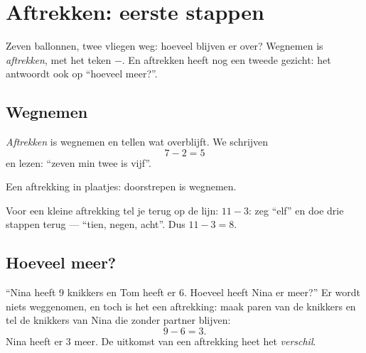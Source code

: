 \chapter{Aftrekken: eerste stappen}\label{ch:g1:subtraction}

Zeven ballonnen, twee vliegen weg: hoeveel blijven er over? Wegnemen is
\emph{aftrekken}, met het teken $-$. En aftrekken heeft nog een tweede
gezicht: het antwoordt ook op ``hoeveel meer?''.

\section{Wegnemen}

\begin{definition}[Aftrekken]\label{def:g1:subtraction:def}
\emph{Aftrekken} is wegnemen en tellen wat overblijft. We schrijven
\[
7 - 2 = 5
\]
en lezen: ``zeven min twee is vijf''.
\end{definition}

\begin{omfigure}

{\small Een aftrekking in plaatjes: doorstrepen is wegnemen.}
\end{omfigure}

\begin{example}[Terugtellen]\label{ex:g1:subtraction:countback}
Voor een kleine aftrekking tel je terug op de lijn: $11 - 3$: zeg
``elf'' en doe drie stappen terug --- ``tien, negen, acht''. Dus
$11 - 3 = 8$.
\end{example}

\section{Hoeveel meer?}

\begin{example}\label{ex:g1:subtraction:difference}
``Nina heeft $9$ knikkers en Tom heeft er $6$. Hoeveel heeft Nina er
meer?'' Er wordt niets weggenomen, en toch is het een aftrekking: maak
paren van de knikkers en tel de knikkers van Nina die zonder partner
blijven:
\[
9 - 6 = 3 .
\]
Nina heeft er $3$ meer. De uitkomst van een aftrekking heet het
\emph{verschil}.
\end{example}

